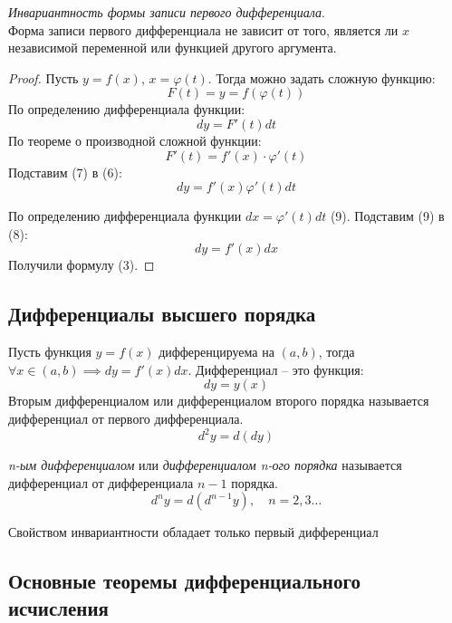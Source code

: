 \begin{theorem}
  \textit{Инвариантность формы записи первого дифференциала}. \\
  Форма записи первого дифференциала не зависит от того, является ли $x$ независимой переменной или функцией другого аргумента.
\end{theorem}
\begin{proof}
  Пусть $y = f(x)$,  $x = \varphi(t)$. Тогда можно задать сложную функцию: \[
  F(t) = y = f(\varphi(t))
  \] 
  По определению дифференциала функции: \[
    dy = F'(t)dt \tag{6}
  \] 
  По теореме о производной сложной функции: \[
    F'(t) = f'(x) \cdot \varphi'(t) \tag{7}
  \] 
  Подставим (7) в (6): \[
    dy = f'(x) \varphi'(t) dt \tag{8} 
  \] 

  По определению дифференциала функции $dx = \varphi'(t)dt$ \quad (9).
  Подставим (9) в (8): \[
    \boxed{dy = f'(x) dx}
  \] 
  Получили формулу (3).
\end{proof}

\subsection{Дифференциалы высшего порядка}

Пусть функция $y = f(x)$ дифференцируема на $(a, b)$, тогда  $\forall x \in (a, b) \implies dy = f'(x)dx$. Дифференциал -- это функция: \[
    dy = y(x)
\] 
Вторым дифференциалом или дифференциалом второго порядка называется дифференциал от первого дифференциала. \[
  d^2y = d(dy)
\] 

\begin{definition}
  \textit{n-ым дифференциалом} или \textit{дифференциалом n-ого порядка} называется дифференциал от дифференциала $n-1$ порядка. \[
    d^ny = d\left(d^{n-1}y\right), \quad n = 2, 3\ldots
  \] 
\end{definition}

\begin{corollary}
  Свойством инвариантности обладает только первый дифференциал
\end{corollary}

\subsection{Основные теоремы дифференциального исчисления}

